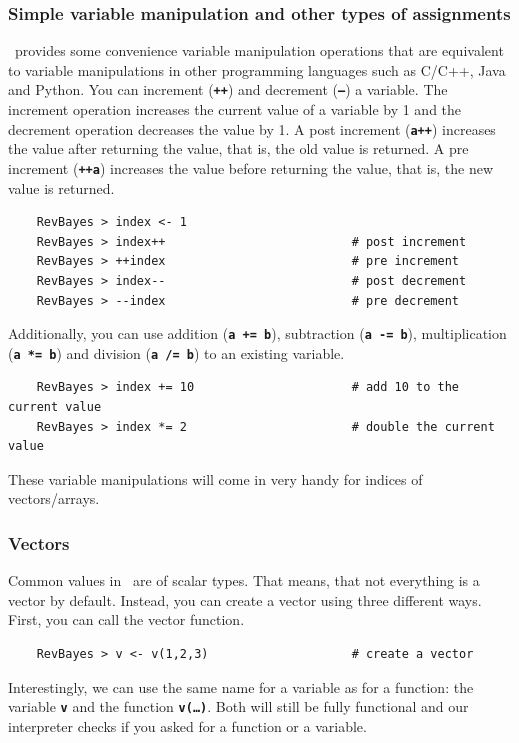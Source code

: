 \documentclass[11pt]{article}
\newcommand{\cl}[1]{{\texttt{\textbf{#1}}}}
\begin{document}
\subsubsection*{Simple variable manipulation and other types of assignments}
\Rev~provides some convenience variable manipulation operations that are equivalent to variable manipulations in other programming languages such as C/C++, Java and Python.
You can increment (\cl{++}) and decrement (\cl{--}) a variable.
The increment operation increases the current value of a variable by 1 and the decrement operation decreases the value by 1.
A post increment (\cl{a++}) increases the value after returning the value, that is, the old value is returned.
A pre increment (\cl{++a}) increases the value before returning the value, that is, the new value is returned.
{\tt \begin{snugshade*}
\begin{lstlisting}    
    RevBayes > index <- 1
    RevBayes > index++                          # post increment
    RevBayes > ++index                          # pre increment
    RevBayes > index--                          # post decrement
    RevBayes > --index                          # pre decrement
\end{lstlisting}
\end{snugshade*}}
Additionally, you can use addition (\cl{a += b}), subtraction (\cl{a -= b}), multiplication (\cl{a *= b}) and division (\cl{a /= b}) to an existing variable.
{\tt \begin{snugshade*}
\begin{lstlisting}    
    RevBayes > index += 10                      # add 10 to the current value
    RevBayes > index *= 2                       # double the current value
\end{lstlisting}
\end{snugshade*}}
These variable manipulations will come in very handy for indices of vectors/arrays.

\subsubsection*{Vectors}
Common values in \RevBayes~are of scalar types.
That means, that not everything is a vector by default.
Instead, you can create a vector using three different ways.
First, you can call the vector function.
{\tt \begin{snugshade*}
\begin{lstlisting}    
    RevBayes > v <- v(1,2,3)                    # create a vector
\end{lstlisting}
\end{snugshade*}}
Interestingly, we can use the same name for a variable as for a function: the variable \cl{v} and the function \cl{v(\ldots)}.
Both will still be fully functional and our interpreter checks if you asked for a function or a variable.
\end{document}
